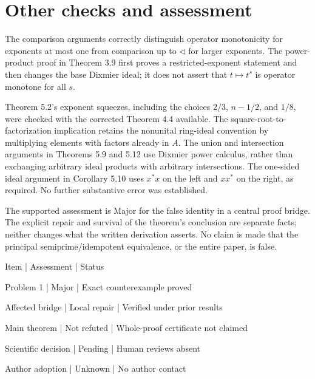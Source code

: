 \documentclass[10pt]{article}
\begin{document}
\section*{Other checks and assessment}
The comparison arguments correctly distinguish operator monotonicity for exponents at most one from comparison up to \(\lhd\) for larger exponents. The power-product proof in Theorem 3.9 first proves a restricted-exponent statement and then changes the base Dixmier ideal; it does not assert that \(t\mapsto t^s\) is operator monotone for all \(s\).\par
Theorem 5.2’s exponent squeezes, including the choices \(2/3\), \(n-1/2\), and \(1/8\), were checked with the corrected Theorem 4.4 available. The square-root-to-factorization implication retains the nonunital ring-ideal convention by multiplying elements with factors already in \(A\). The union and intersection arguments in Theorems 5.9 and 5.12 use Dixmier power calculus, rather than exchanging arbitrary ideal products with arbitrary intersections. The one-sided ideal argument in Corollary 5.10 uses \(x^*x\) on the left and \(xx^*\) on the right, as required. No further substantive error was established.\par
The supported assessment is Major for the false identity in a central proof bridge. The explicit repair and survival of the theorem’s conclusion are separate facts; neither changes what the written derivation asserts. No claim is made that the principal semiprime/idempotent equivalence, or the entire paper, is false.\par
Item | Assessment | Status\par
Problem 1 | Major | Exact counterexample proved\par
Affected bridge | Local repair | Verified under prior results\par
Main theorem | Not refuted | Whole-proof certificate not claimed\par
Scientific decision | Pending | Human reviews absent\par
Author adoption | Unknown | No author contact\par
\end{document}
